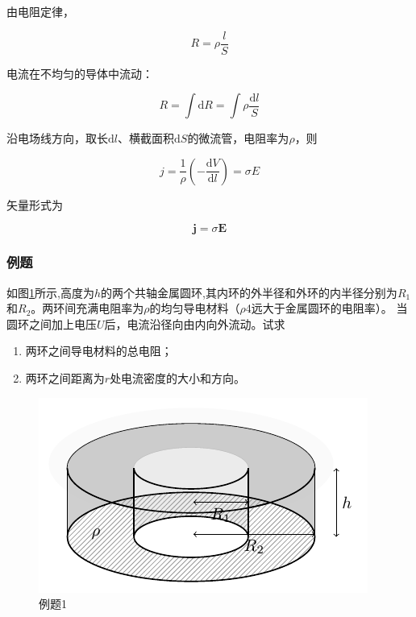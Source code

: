 \documentclass[12pt]{article}
\newcommand{\rmd}{\mathrm{d}}
\newcommand{\deriv}[2]{\frac{\rmd #1}{\rmd #2}}
\begin{document}
由电阻定律，

\begin{equation}
    R = \rho \frac{l}{S}
\end{equation}

电流在不均匀的导体中流动：

\begin{equation}
    R = \int \rmd R = \int \rho \frac{\rmd l}{S}
\end{equation}

沿电场线方向，取长$\rmd l$、横截面积$\rmd S$的微流管，电阻率为$\rho$，则

\begin{equation}
    j = \frac{1}{\rho}\left(-\deriv{V}{l}\right) = \sigma E
\end{equation}

矢量形式为

\begin{equation}
    \boldsymbol{j} = \sigma \boldsymbol{E}
\end{equation}

\subsubsection{例题}

如图\ref{p12-1}所示,高度为\(h\)的两个共轴金属圆环,其内环的外半径和外环的内半径分别为\(R_1\)和\(R_2\)。两环间充满电阻率为\(\rho\)的均匀导电材料（$\rho$4远大于金属圆环的电阻率）。
当圆环之间加上电压\(U\)后，电流沿径向由内向外流动。试求

\begin{enumerate}
    \item 两环之间导电材料的总电阻；
    \item 两环之间距离为\(r\)处电流密度的大小和方向。
\end{enumerate}

\begin{figure}[!h]
    \centering
    \includegraphics{graphics/p12.1.pdf}
    \caption{例题1}
    \label{p12-1}
\end{figure}
\end{document}
